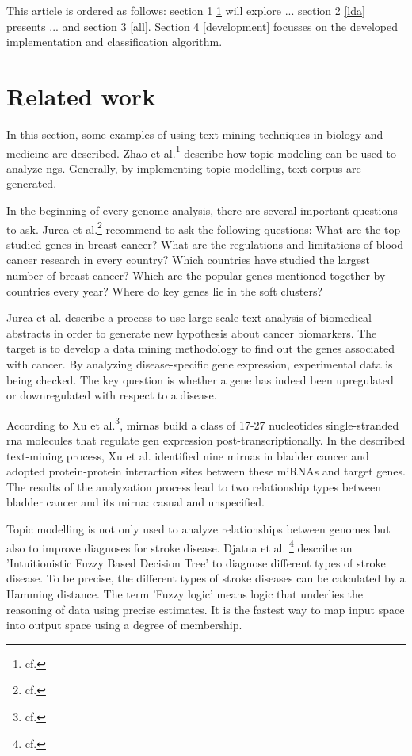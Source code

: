 This article is ordered as follows: section 1 \ref{related} will explore ...
section 2 \ref{lda} presents ... and section 3 \ref{all}. Section 4 \ref{development} focusses on the developed implementation and classification algorithm.


\chapter{Related work}\label{related}

In this section, some examples of using text mining techniques in biology and medicine are described.
Zhao et al.\footnote{cf.\autocite{zhao_2016}} describe how topic modeling can be used to analyze \gls{ngs}. Generally, by implementing topic modelling, text corpus are generated.

In the beginning of every genome analysis, there are several important questions to ask. Jurca et al.\footnote{cf.\autocite{jurca_2016}} recommend to ask the following questions: What are the top studied genes in breast cancer? What are the regulations and limitations of blood cancer research in every country? Which countries have studied the largest number of breast cancer? Which are the popular genes mentioned together by countries every year? Where do key genes lie in the soft clusters?

Jurca et al. describe a process to use large-scale text analysis of biomedical abstracts in order to generate new hypothesis about cancer biomarkers. The target is to develop a data mining methodology to find out the genes associated with cancer. By analyzing disease-specific gene expression, experimental data is being checked. The key question is whether a gene has indeed been upregulated or downregulated with respect to a disease.

According to Xu et al.\footnote{cf.\autocite{xu_2013}}, \gls{mirna}s build a class of 17-27 nucleotides single-stranded \gls{rna} molecules that regulate gen expression post-transcriptionally. In the described text-mining process, Xu et al. identified nine \gls{mirna}s in bladder cancer and adopted protein-protein interaction sites between these miRNAs and target genes. The results of the analyzation process lead to two relationship types between bladder cancer and its \gls{mirna}: casual and unspecified. 

Topic modelling is not only used to analyze relationships between genomes but also to improve diagnoses for stroke disease. Djatna et al. \footnote{cf.\autocite{djatna_2018}} describe an 'Intuitionistic Fuzzy Based Decision Tree' to diagnose different types of stroke disease. To be precise, the different types of stroke diseases can be calculated by a Hamming distance. The term 'Fuzzy logic' means logic that underlies the reasoning of data using precise estimates. It is the fastest way to map input space into output space using a degree of membership.

